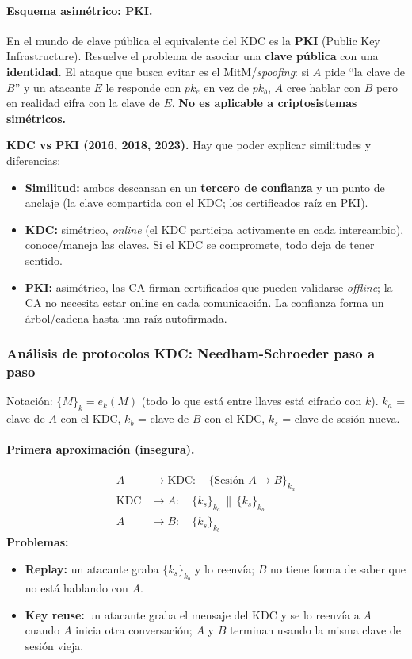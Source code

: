 \documentclass[../main.tex]{subfiles}
\begin{document}
\paragraph{Esquema asimétrico: PKI.} En el mundo de clave pública el equivalente del
KDC es la \textbf{PKI} (Public Key Infrastructure). Resuelve el problema de asociar
una \textbf{clave pública} con una \textbf{identidad}. El ataque que busca evitar es
el MitM/\emph{spoofing}: si $A$ pide ``la clave de $B$'' y un atacante $E$ le
responde con $pk_e$ en vez de $pk_b$, $A$ cree hablar con $B$ pero en realidad cifra
con la clave de $E$. \textbf{No es aplicable a criptosistemas simétricos.}

\begin{examen}
\textbf{KDC vs PKI (2016, 2018, 2023).} Hay que poder explicar similitudes y
diferencias:
\begin{itemize}[leftmargin=1.3em]
  \item \textbf{Similitud:} ambos descansan en un \textbf{tercero de confianza} y un
  punto de anclaje (la clave compartida con el KDC; los certificados raíz en PKI).
  \item \textbf{KDC:} simétrico, \emph{online} (el KDC participa activamente en cada
  intercambio), conoce/maneja las claves. Si el KDC se compromete, todo deja de
  tener sentido.
  \item \textbf{PKI:} asimétrico, las CA firman certificados que pueden validarse
  \emph{offline}; la CA no necesita estar online en cada comunicación. La confianza
  forma un árbol/cadena hasta una raíz autofirmada.
\end{itemize}
\end{examen}

\subsubsection{Análisis de protocolos KDC: Needham-Schroeder paso a paso}

Notación: $\{M\}_k = e_k(M)$ (todo lo que está entre llaves está cifrado con $k$).
$k_a$ = clave de $A$ con el KDC, $k_b$ = clave de $B$ con el KDC, $k_s$ = clave de
sesión nueva.

\paragraph{Primera aproximación (insegura).}
\begin{align*}
A &\to \text{KDC}: \quad \{\text{Sesión } A \to B\}_{k_a} \\
\text{KDC} &\to A: \quad \{k_s\}_{k_a} \,\|\, \{k_s\}_{k_b} \\
A &\to B: \quad \{k_s\}_{k_b}
\end{align*}
\textbf{Problemas:}
\begin{itemize}[leftmargin=1.4em]
  \item \textbf{Replay:} un atacante graba $\{k_s\}_{k_b}$ y lo reenvía; $B$ no tiene
  forma de saber que no está hablando con $A$.
  \item \textbf{Key reuse:} un atacante graba el mensaje del KDC y se lo reenvía a
  $A$ cuando $A$ inicia otra conversación; $A$ y $B$ terminan usando la misma clave
  de sesión vieja.
\end{itemize}
\end{document}
